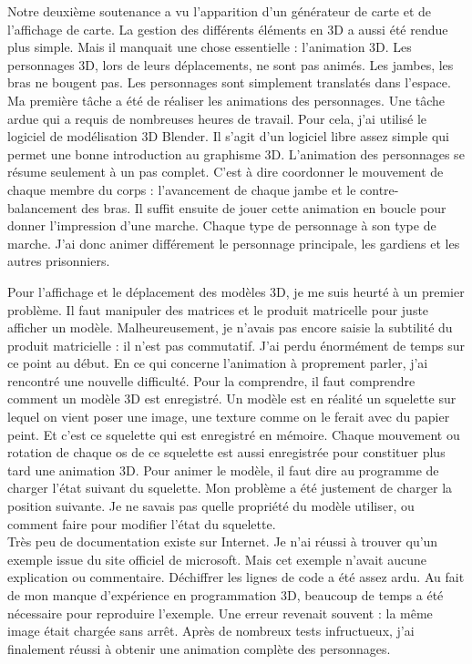 \documentclass[12pt]{article}
\begin{document}
Notre deuxième soutenance a vu l'apparition d'un générateur de carte et de l'affichage de carte. La gestion des différents éléments en 3D a aussi été rendue plus simple. Mais il manquait une chose essentielle : l'animation 3D. Les personnages 3D, lors de leurs déplacements, ne sont pas animés. Les jambes, les bras ne bougent pas. Les personnages sont simplement translatés dans l'espace. Ma première tâche a été de réaliser les animations des personnages. Une tâche ardue qui a requis de nombreuses heures de travail. Pour cela, j'ai utilisé le logiciel de modélisation 3D Blender. Il s'agit d'un logiciel libre assez simple qui permet une bonne introduction au graphisme 3D. L'animation des personnages se résume seulement à un pas complet. C'est à dire coordonner le mouvement de chaque membre du corps : l'avancement de chaque jambe et le contre-balancement des bras. Il suffit ensuite de jouer cette animation en boucle pour donner l'impression d'une marche. Chaque type de personnage à son type de marche. J'ai donc animer différement le personnage principale, les gardiens et les autres prisonniers. 

Pour l'affichage et le déplacement des modèles 3D, je me suis heurté à un premier problème. Il faut manipuler des matrices et le produit matricelle pour juste afficher un modèle. Malheureusement, je n'avais pas encore saisie la subtilité du produit matricielle : il n'est pas commutatif. J'ai perdu énormément de temps sur ce point au début. En ce qui concerne l'animation à proprement parler, j'ai rencontré une nouvelle difficulté. Pour la comprendre, il faut comprendre comment un modèle 3D est enregistré. Un modèle est en réalité un squelette sur lequel on vient poser une image, une texture comme on le ferait avec du papier peint. Et c'est ce squelette qui est enregistré en mémoire. Chaque mouvement ou rotation de chaque os de ce squelette est aussi enregistrée pour constituer plus tard une animation 3D. Pour animer le modèle, il faut dire au programme de charger l'état suivant du squelette. Mon problème a été justement de charger la position suivante. Je ne savais pas quelle propriété du modèle utiliser, ou comment faire pour modifier l'état du squelette. \\
Très peu de documentation existe sur Internet. Je n'ai réussi à trouver qu'un exemple issue du site officiel de microsoft. Mais cet exemple n'avait aucune explication ou commentaire. Déchiffrer les lignes de code a été assez ardu. Au fait de mon manque d'expérience en programmation 3D, beaucoup de temps a été nécessaire pour reproduire l'exemple. Une erreur revenait souvent : la même image était chargée sans arrêt. Après de nombreux tests infructueux, j'ai finalement réussi à obtenir une animation complète des personnages.
\end{document}
